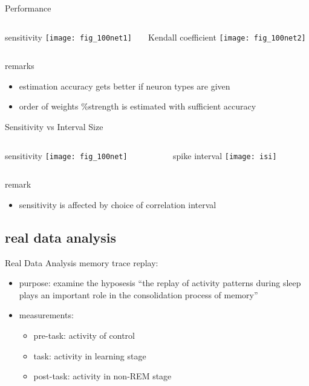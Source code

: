 \documentclass[fleqn,aspectratio=1610]{beamer}
\begin{document}
\begin{frame}[label={sec:org8d99f00}]{Performance}
\begin{columns}
\begin{column}{0.5\columnwidth}
\centering
sensitivity
\texttt{[image: fig\_100net1]}
\end{column}
\begin{column}{0.5\columnwidth}
\centering
Kendall coefficient
\texttt{[image: fig\_100net2]}
\end{column}
\end{columns}
\begin{alertblock}{remarks}
\begin{itemize}
\item estimation accuracy gets better if neuron types are given
\item order of weights \%strength
is estimated with sufficient accuracy
\end{itemize}
\end{alertblock}
\end{frame}

\begin{frame}[label={sec:org9edb220}]{Sensitivity vs Interval Size}
\begin{columns}
\begin{column}{0.5\columnwidth}
\centering
sensitivity
\texttt{[image: fig\_100net]}
\end{column}
\begin{column}{0.5\columnwidth}
\centering
spike interval
\texttt{[image: isi]}
\end{column}
\end{columns}
\begin{alertblock}{remark}
\begin{itemize}
\item sensitivity is affected by choice of
correlation interval
\end{itemize}
\end{alertblock}
\end{frame}
\subsection{real data analysis}
\label{sec:org6ab3cf8}
\begin{frame}[label={sec:org084a7c1}]{Real Data Analysis}
memory trace replay:
\parencites{WilsonMcNaughton1994,TatsunoLipaMcNaughton2006}

\begin{itemize}
\item purpose: 
examine the hyposesis ``the replay of activity patterns during sleep 
plays an important role in the consolidation process of memory''
\item measurements:
\begin{itemize}
\item pre-task: activity of control
\item task: activity in learning stage
\item post-task: activity in non-REM stage
\end{itemize}
\end{itemize}
\end{frame}
\end{document}

